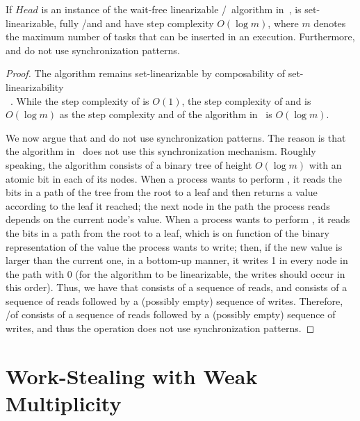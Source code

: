 \begin{theorem}\label{theo-wf-log}
If $Head$ is an instance of the wait-free linearizable \R/\W\ \MaxReg algorithm in~\cite{DBLP_journals_jacm_AspnesAC12}, \WFWSM is set-linearizable, fully \R/\W and \Take and \Steal have step complexity $O(\log m)$, where $m$ denotes the maximum number of tasks that can be inserted in an execution. Furthermore, \Take and \Steal do not use \RAW synchronization patterns.
\end{theorem}

\begin{proof}
The algorithm remains set-linearizable by composability of set-linearizability\\~\cite{DBLP_journals_jacm_CastanedaRR18}.  While the step complexity of \Put is $O(1)$, the step complexity of \Take and \Steal is $O(\log m)$ as the step complexity \MaxR and \MaxW of the \MaxReg algorithm in~\cite{DBLP_journals_jacm_AspnesAC12} is $O(\log m)$.

We now argue that \Take and \Steal do not use \RAW synchronization patterns.  The reason is that the \MaxReg algorithm in~\cite{DBLP_journals_jacm_AspnesAC12} does not use this synchronization mechanism.  Roughly speaking, the algorithm consists of a binary tree of height $O(\log m)$ with an atomic bit in each of its nodes.  When a process wants to perform \MaxR, it reads the bits in a path of the tree from the root to a leaf and then returns a value according to the leaf it reached; the next node in the path the process reads depends on the current node's value.  When a process wants to perform \MaxW, it reads the bits in a path from the root to a leaf, which is on function of the binary representation of the value the process wants to write; then, if the new value is larger than the current one, in a bottom-up manner, it writes 1 in every node in the path with 0 (for the algorithm to be linearizable, the writes should occur in this order).  Thus, we have that \MaxR consists of a sequence of reads, and \MaxW consists of a sequence of reads followed by a (possibly empty) sequence of writes.  Therefore, \Take/\Steal of \WFWSM consists of a sequence of reads followed by a (possibly empty) sequence of writes, and thus the operation does not use \RAW synchronization patterns.
\end{proof}

\section{\label{sec-ws-nc-mult}Work-Stealing with Weak Multiplicity}

